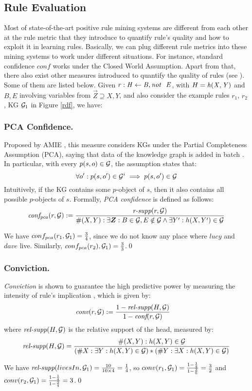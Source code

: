 \subsection{Rule Evaluation}
Most of state-of-the-art positive rule mining systems are different from each other at the rule metric that they introduce to quantify rule's quality and how to exploit it in learning rules. Basically, we can plug different rule metrics into these mining systems to work under different situations. For instance, standard confidence $conf$ works under the Closed World Assumption. Apart from that, there also exist other measures introduced to quantify the quality of rules (see \cite{metrics-summary}). Some of them are listed below. Given $r:\mathit{H\leftarrow B, \mathit{not}~ \ E}$, with $H=\mathit{h(X,Y)}$ and $B,E$ involving variables from $\vec{Z}\supseteq X,Y$, and also consider the example rules $r_1$, $r_2$, KG $\mathcal{G}_1$ in Figure \ref{rdf}, we have:
\subsubsection{PCA Confidence.} Proposed by AMIE \cite{amie}, this measure considers KGs under the Partial Completeness Assumption (PCA), saying that data of the knowledge graph is added in batch \cite{amie}. In particular, with every $p(s,o) \in \mathcal{G}$, the assumption states that:
\[\forall o' : p(s,o') \in \mathcal{G}^i \implies p(s,o') \in \mathcal{G}\]
Intuitively, if the KG contains some $p$-object of $s$, then it also contains all possible $p$-objects of $s$. Formally, \textit{PCA confidence} is defined as follows:
\[
\mi{conf_{pca}}(r, \cG) := \frac{\textit{r-supp}(r, \cG)}{\#(X,Y): \exists \vec{Z}: B \in \cG, E \notin \cG  \wedge \exists Y': h(X,Y')\in \cG}
\]
\begin{example}
We have $conf_{pca}(r_1,\mathcal{G}_1) = \frac{3}{4}$, since we do not know any place where $lucy$ and $dave$ live. Similarly, $conf_{pca}(r_2),\mathcal{G}_1) = \frac{3}{3}$.\qed
\end{example}
\subsubsection{Conviction.} \textit{Conviction} is shown to guarantee the high predictive power \cite{Azevedo2007} by measuring the intensity of rule's implication \cite{metrics-summary}, which is given by:
\begin{align*}
\textit{conv}(r,\mathcal{G}) & := \frac{1 - \textit{rel-supp}(H, \mathcal{G})}{1-\textit{conf}(r,\mathcal{G})}
\end{align*}
where $\textit{rel-supp}(H, \mathcal{G})$ is the relative support of the head, measured by:
\begin{align*}
\textit{rel-supp}(H, \mathcal{G}) = \dfrac{\#(X,Y):h(X,Y)\in \mathcal{G}}{(\#X:\exists Y:h(X,Y)\in \mathcal{G})*(\#Y:\exists X:h(X,Y)\in \mathcal{G})}
\end{align*}
\begin{example}
We have $\textit{rel-supp}(livesIn, \mathcal{G}_1) = \frac{10}{10 \times 4} = \frac{1}{4}$, so $conv(r_1,\mathcal{G}_1) = \frac{1-\frac{1}{4}}{1-\frac{3}{6}} = \frac{3}{2}$ and $conv(r_2,\mathcal{G}_1) = \frac{1-\frac{1}{4}}{1-\frac{3}{4}} = 3$.\qed
\end{example}
